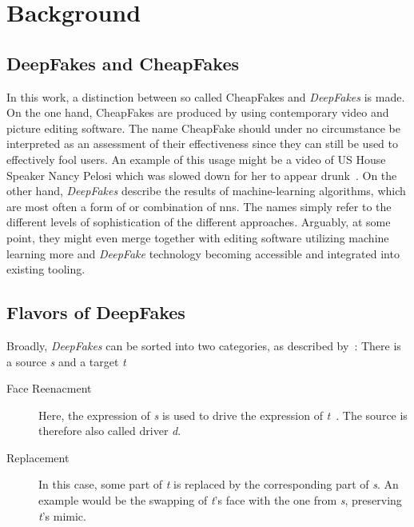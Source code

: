 \section{Background}\label{sect:background}

\subsection{DeepFakes and CheapFakes}
In this work, a distinction between so called CheapFakes and \textit{DeepFakes}
is made. On the one hand, CheapFakes are produced by using contemporary video 
and picture editing software. The name CheapFake should under no circumstance be
interpreted as an assessment of their effectiveness since they can still be used
to effectively fool users. An example of this usage might be a video of US House
Speaker Nancy Pelosi which was slowed down for her to appear drunk~\cite{Fichera.2019}.
On the other hand, \textit{DeepFakes} describe the results of machine-learning
algorithms, which are most often a form of or combination of \glspl{nn}.
The names simply refer to the different levels of sophistication of the different
approaches. Arguably, at some point, they might even merge together with editing 
software utilizing machine learning more and \textit{DeepFake} technology becoming
accessible and integrated into existing tooling.

\subsection{Flavors of DeepFakes}\label{subsubsect:deepfake-flavors}
Broadly, \textit{DeepFakes} can be sorted into two categories, as described by~\textcite{Mirsky.2020}:
There is a source \textit{s} and a target \textit{t}

\begin{description}
    \item[Face Reenacment] Here, the expression of \textit{s} is used to drive
    the expression of \textit{t}~\cite{Mirsky.2020}. The source is
    therefore also called driver \textit{d}.
    \item[Replacement] In this case, some part of \textit{t} is replaced
    by the corresponding part of \textit{s}. An example would be the swapping of
    \textit{t}'s face with the one from \textit{s}, preserving \textit{t}'s mimic.
\end{description}

